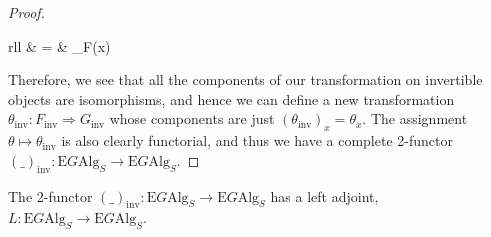 \documentclass{amsart} %
\newenvironment{eq*}{\begin{equation*}}{\end{equation*}}
\begin{document}
\begin{proof}
\begin{eq*}
\begin{array}{rll}
		& = &  _{F(x)} \\
		\end{array} 
\end{eq*}
Therefore, we see that all the components of our transformation on invertible objects are isomorphisms, and hence we can define a new transformation $\theta_{\mathrm{inv}}: F_{\mathrm{inv}} \Rightarrow G_{\mathrm{inv}}$ whose components are just $(\theta_{\mathrm{inv}})_x = \theta_x$. The assignment $\theta \mapsto \theta_{\mathrm{inv}}$ is also clearly functorial, and thus we have a complete 2-functor $(\_)_{\mathrm{inv}}: \mathrm{E}G\mathrm{Alg}_S \to \mathrm{E}G\mathrm{Alg}_S$.
\end{proof}

\begin{prop} The 2-functor $(\_)_{\mathrm{inv}}: \mathrm{E}G\mathrm{Alg}_S \to \mathrm{E}G\mathrm{Alg}_S$ has a left adjoint, $L: \mathrm{E}G\mathrm{Alg}_S \to \mathrm{E}G\mathrm{Alg}_S$.
\end{prop}
\end{document}
